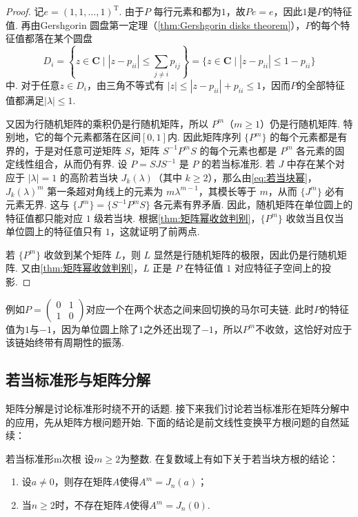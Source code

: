 \begin{proof}
    记$e=(1,1,\ldots,1)^\mathrm{T}$. 由于$P$ 每行元素和都为$1$，故$Pe=e$，因此$1$是$P$的特征值. 再由Gershgorin 圆盘第一定理（\autoref{thm:Gershgorin disks theorem}），$P$的每个特征值都落在某个圆盘
    \[D_i=\left\{z\in\mathbf{C}\mid |z-p_{ii}|\leqslant \sum_{j\neq i}p_{ij}\right\}=\{z\in\mathbf{C}\mid |z-p_{ii}|\leqslant 1-p_{ii}\}\]
    中. 对于任意$z\in D_i$，由三角不等式有 $|z|\leqslant |z-p_{ii}|+p_{ii}\leqslant 1$，因而$P$的全部特征值都满足$|\lambda|\leqslant 1$.

    又因为行随机矩阵的乘积仍是行随机矩阵，所以 $P^m$（$m\geqslant 1$）仍是行随机矩阵. 特别地，它的每个元素都落在区间$[0,1]$内. 因此矩阵序列 $\{P^m\}$ 的每个元素都是有界的，于是对任意可逆矩阵 $S$，矩阵 $S^{-1}P^mS$ 的每个元素也都是 $P^m$ 各元素的固定线性组合，从而仍有界. 设 $P = SJS^{-1}$ 是 $P$ 的若当标准形. 若 $J$ 中存在某个对应于 $|\lambda| = 1$ 的高阶若当块 $J_k(\lambda)$（其中 $k \geqslant 2$），那么由\autoref{eq:若当块幂}，$J_k(\lambda)^m$ 第一条超对角线上的元素为 $m\lambda^{m-1}$，其模长等于 $m$，从而 $\{J^m\}$ 必有元素无界. 这与 $\{J^m\}=\{S^{-1}P^mS\}$ 各元素有界矛盾. 因此，随机矩阵在单位圆上的特征值都只能对应 $1$ 级若当块. 根据\autoref{thm:矩阵幂收敛判别}，$\{P^m\}$ 收敛当且仅当单位圆上的特征值只有 $1$，这就证明了前两点.

    若 $\{P^m\}$ 收敛到某个矩阵 $L$，则 $L$ 显然是行随机矩阵的极限，因此仍是行随机矩阵. 又由\autoref{thm:矩阵幂收敛判别}，$L$ 正是 $P$ 在特征值 $1$ 对应特征子空间上的投影.
\end{proof}

例如$P=\begin{pmatrix}
        0 & 1 \\
        1 & 0
    \end{pmatrix}$对应一个在两个状态之间来回切换的马尔可夫链. 此时$P$的特征值为$1$与$-1$，因为单位圆上除了$1$之外还出现了$-1$，所以$P^m$不收敛，这恰好对应于该链始终带有周期性的振荡.

\subsection{若当标准形与矩阵分解}
矩阵分解是讨论标准形时绕不开的话题. 接下来我们讨论若当标准形在矩阵分解中的应用，先从矩阵方根问题开始. 下面的结论是前文线性变换平方根问题的自然延续：
\begin{theorem}{}{若当标准形m次根}
    设$m\geqslant 2$为整数. 在复数域上有如下关于若当块方根的结论：
    \begin{enumerate}
        \item 设$a\neq 0$，则存在矩阵$A$使得$A^m=J_n(a)$；
        \item 当$n\geqslant 2$时，不存在矩阵$A$使得$A^m=J_n(0)$.
    \end{enumerate}
\end{theorem}

